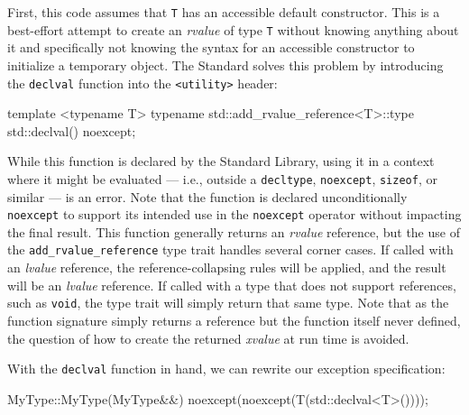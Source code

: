 First, this code assumes that \lstinline!T! has an accessible default
constructor. This is a best-effort attempt to create an \emph{rvalue} of
type \lstinline!T! without knowing anything about it and specifically not
knowing the syntax for an accessible constructor to initialize a
temporary object. The Standard solves this problem by introducing the
\lstinline!declval! function into the \lstinline!<utility>! header:

\begin{emcppslisting}
template <typename T>
typename std::add_rvalue_reference<T>::type std::declval() noexcept;
\end{emcppslisting}
    

\noindent While this function is declared by the Standard Library, using it in a
context where it might be evaluated --- i.e., outside a
\lstinline!decltype!, \lstinline!noexcept!, \lstinline!sizeof!, or similar --- is
an error. Note that the function is declared unconditionally
\lstinline!noexcept! to support its intended use in the \lstinline!noexcept!
operator without impacting the final result. This function generally
returns an \emph{rvalue} reference, but the use of the
\lstinline!add_rvalue_reference! type trait handles several corner cases.
If called with an \emph{lvalue} reference, the reference-collapsing
rules will be applied, and the result will be an \emph{lvalue}
reference. If called with a type that does not support references, such
as \lstinline!void!, the type trait will simply return that same type. Note
that as the function signature simply returns a reference but the
function itself never defined, the question of how to create the
returned \emph{xvalue} at run time is avoided.

With the \lstinline!declval! function in hand, we can rewrite our exception
specification:

\begin{emcppslisting}
MyType::MyType(MyType&&) noexcept(noexcept(T(std::declval<T>())));
\end{emcppslisting}
    

